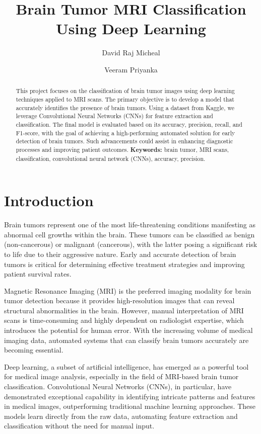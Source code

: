 \documentclass[twocolumn]{article}
\title{Brain Tumor MRI Classification Using Deep Learning}
\author{David Raj Micheal}
\author{Veeram Priyanka}
\affil{School of Advanced Sciences, Vellore Institute of Technology Chennai, India}
\date{}
\begin{document}
\maketitle

\begin{abstract}
This project focuses on the classification of brain tumor images using deep learning techniques applied to MRI scans. The primary objective is to develop a model that accurately identifies the presence of brain tumors. Using a dataset from Kaggle, we leverage Convolutional Neural Networks (CNNs) for feature extraction and classification. The final model is evaluated based on its accuracy, precision, recall, and F1-score, with the goal of achieving a high-performing automated solution for early detection of brain tumors. Such advancements could assist in enhancing diagnostic processes and improving patient outcomes.
\textbf{Keywords:} brain tumor, MRI scans, classification, convolutional neural network (CNNs), accuracy, precision.
\end{abstract}

\section{Introduction}
Brain tumors represent one of the most life-threatening conditions manifesting as abnormal cell growths within the brain. These tumors can be classified as benign (non-cancerous) or malignant (cancerous), with the latter posing a significant risk to life due to their aggressive nature. Early and accurate detection of brain tumors is critical for determining effective treatment strategies and improving patient survival rates.

Magnetic Resonance Imaging (MRI) is the preferred imaging modality for brain tumor detection because it provides high-resolution images that can reveal structural abnormalities in the brain. However, manual interpretation of MRI scans is time-consuming and highly dependent on radiologist expertise, which introduces the potential for human error. With the increasing volume of medical imaging data, automated systems that can classify brain tumors accurately are becoming essential.

Deep learning, a subset of artificial intelligence, has emerged as a powerful tool for medical image analysis, especially in the field of MRI-based brain tumor classification. Convolutional Neural Networks (CNNs), in particular, have demonstrated exceptional capability in identifying intricate patterns and features in medical images, outperforming traditional machine learning approaches. These models learn directly from the raw data, automating feature extraction and classification without the need for manual input.
\end{document}
